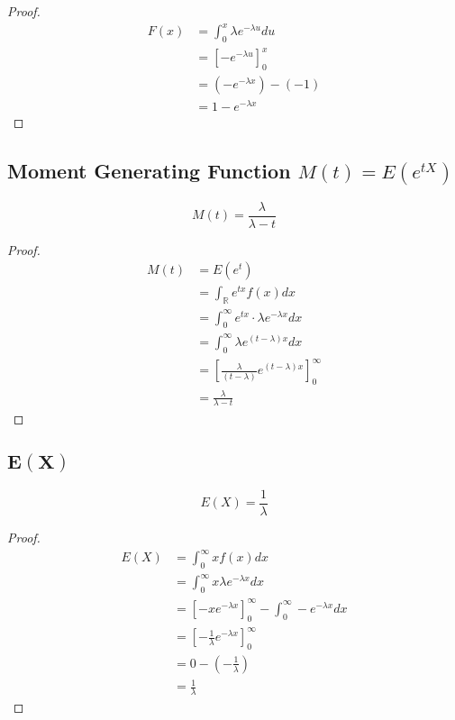 \documentclass[12pt]{article}
\begin{document}
\begin{proof}
  \begin{align*}
    F(x) &= \int_{0}^{x} \lambda e^{-\lambda u} du \\
         &= \left[-e^{-\lambda u} \right]_{0}^{x} \\
         &= (-e^{-\lambda x}) - (-1) \\
         &= 1 - e^{-\lambda x}
  \end{align*}
\end{proof}
\subsection{Moment Generating Function $M(t)=E(e^{tX})$}

\begin{equation*}
    M(t)=\frac{\lambda}{\lambda -t}
\end{equation*}
\begin{proof}
\begin{align*}
  M(t) &= E(e^{t}) \\
       &= \int_{\mathbb{R}} e^{tx} f(x) dx \\
       &= \int_{0}^{\infty} e^{tx} \cdot \lambda e^{-\lambda x} dx \\
       &= \int_{0}^{\infty} \lambda e^{(t-\lambda)x} dx \\
       &= \left[\frac{\lambda}{(t-\lambda)}e^{(t-\lambda)x} \right]_{0}^{\infty} \\
       &= \frac{\lambda}{\lambda -t}
\end{align*}
\end{proof}
\subsection{$\bm{E(X)}$}

\begin{equation*}
  E(X) = \frac{1}{\lambda}
\end{equation*}

\begin{proof}
  \begin{align*}
    E(X) &= \int_{0}^{\infty} x f(x) dx\\
         &= \int_{0}^{\infty} x \lambda e^{-\lambda x} dx \\
         &= [-xe^{-\lambda x}]_{0}^{\infty} - \int_{0}^{\infty} -e^{-\lambda x}dx \\
         &= \left[-\frac{1}{\lambda} e^{-\lambda x} \right]_{0}^{\infty} \\
         &= 0 - \left(-\frac{1}{\lambda}\right) \\
         &= \frac{1}{\lambda}
  \end{align*}
\end{proof}
\end{document}
